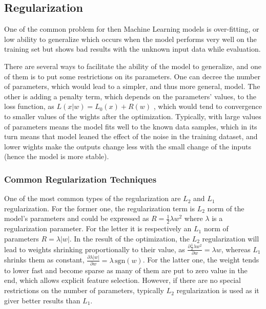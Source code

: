 \subsection{Regularization}

One of the common problem for then Machine Learning models is over-fitting, or low ability to generalize which occurs when the model performs very well on the training set but shows bad results with the unknown input data while evaluation.
\medskip

There are several ways to facilitate the ability of the model to generalize, and one of them is to put some restrictions on its parameters.
One can decree the number of parameters, which would lead to a simpler, and thus more general, model.
The other is adding a penalty term, which depends on the parameters' values, to the loss function, as $L(x|w) = L_{0}(x) + R(w)$ , which would tend to convergence to smaller values of the wights after the optimization. 
Typically, with large values of parameters means the model fits well to the known data samples, which in its turn means that model leaned the effect of the noise in the training dataset, and lower wights make the outputs change less with the small change of the inputs (hence the model is more stable).
\medskip

\subsubsection{Common Regularization Techniques}

One of the most common types of the regularization are $L_{2}$ and $L_{1}$ regularization.
For the former one, the regularization term is $L_{2}$ norm of the model's parameters and could be expressed as $R=\frac{1}{2}\lambda w^{2}$ where $\lambda$ is a regularization parameter.
For the letter it is respectively an $L_{1}$ norm of parameters $R=\lambda |w|$.
In the result of the optimization, the $L_{2}$ regularization will lead to weights shrinking proportionally to their value, as $\frac{\partial \frac{1}{2} \lambda w^{2} }{\partial w} = \lambda w$, whereas $L_{1}$ shrinks them as constant, $\frac{\partial \lambda |w| }{\partial w} = \lambda \, \mathrm{sgn}(w) $.
For the latter one, the weight tends to lower fast and become sparse as many of them are put to zero value in the end, which allows explicit feature selection.
However, if there are no special restrictions on the number of parameters, typically $L_{2}$ regularization is used as it giver better results than $L_{1}$.
\medskip

